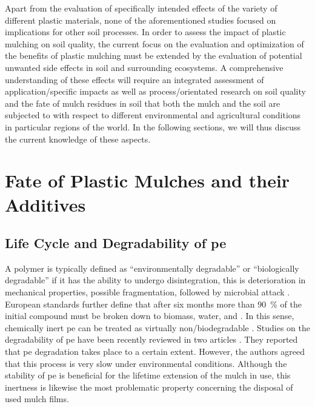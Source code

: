 Apart from the evaluation of specifically intended effects of the variety of different plastic materials, none of the aforementioned studies focused on implications for other soil processes. In order to assess the impact of plastic mulching on soil quality, the current focus on the evaluation and optimization of the benefits of plastic mulching must be extended by the evaluation of potential unwanted side effects in soil and surrounding ecosystems. A comprehensive understanding of these effects will require an integrated assessment of application\-/specific impacts as well as process\-/orientated research on soil quality and the fate of mulch residues in soil that both the mulch and the soil are subjected to with respect to different environmental and agricultural conditions in particular regions of the world. In the following sections, we will thus discuss the current knowledge of these aspects.

\section{Fate of Plastic Mulches and their Additives}
\label{sec:plastic-mulching:fate}

\subsection{Life Cycle and Degradability of \Acs{pe}}
\label{sec:plastic-mulching:life-cycle}

A polymer is typically defined as ``environmentally degradable'' or ``biologically degradable'' if it has the ability to undergo disintegration, this is deterioration in mechanical properties, possible fragmentation, followed by microbial attack \citep{KrzanStandardization2006}. European standards further define that after six months more than \SI{90}{\percent} of the initial compound must be broken down to biomass, water, and  \citep{DINEN13432Packaging2000}. In this sense, chemically inert \ac{pe} can be treated as virtually non\-/biodegradable \citep{AlbertssonMechanism1987}. Studies on the degradability of \ac{pe} have been recently reviewed in two articles \citep{KruegerProspects2015,Restrepo-FlorezMicrobial2014}. They reported that \ac{pe} degradation takes place to a certain extent. However, the authors agreed that this process is very slow under environmental conditions. Although the stability of \ac{pe} is beneficial for the lifetime extension of the mulch in use, this inertness is likewise the most problematic property concerning the disposal of used mulch films.

